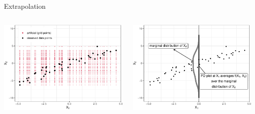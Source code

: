 \documentclass[11pt,compress,t,notes=noshow, aspectratio=169, xcolor=table]{beamer}
\begin{document}
\begin{vbframe}{Extrapolation}
\begin{columns}[T]
\begin{column}{0.5\textwidth}
\centering
\includegraphics[width=\textwidth]{figure/ale_scatter_grid}
\end{column}
\begin{column}{0.5\textwidth}
\centering
\includegraphics[width=\textwidth]{figure/ale_pdplot}
\end{column}
\end{columns}


\end{vbframe}
\end{document}
